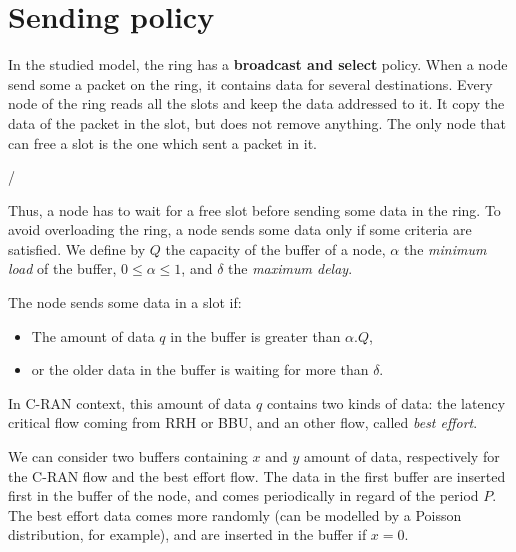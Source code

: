 \documentclass[a4paper,10pt]{article}
\begin{document}
\section*{Sending policy}
In the studied model, the ring has a {\bf broadcast and select} policy.
When a node send some a packet on the ring, it contains data for several destinations. Every node of the ring reads all the slots and keep the data addressed to it. It copy the data of the packet in the slot, but does not remove anything. The only node that can free a slot is the one which sent a packet in it.

/%

Thus, a node has to wait for a free slot before sending some data in the ring. To avoid overloading the ring, a node sends some data only if some criteria  are satisfied.
We define by $Q$ the capacity of the buffer of a node, $\alpha$ the {\em minimum load} of the buffer, $0 \leq  \alpha \leq 1$, and $\delta$ the {\em maximum delay}.

The node sends some data in a slot if:
\begin{itemize}
 \item The amount of data $q$ in the buffer is greater than $\alpha . Q$,
 \item or the older data in the buffer is waiting for more than $\delta$.
\end{itemize}

In C-RAN context, this amount of data $q$ contains two kinds of data: the latency critical flow coming from RRH or BBU, and an other flow, called {\em best effort}.

We can consider two buffers containing $x$ and $y$ amount of data, respectively for the C-RAN flow and the best effort flow.
The data in the first buffer are inserted first in the buffer of the node, and comes periodically in regard of the period $P$. 
The best effort data comes more randomly (can be modelled by a Poisson distribution, for example), and are inserted in the buffer if $x = 0$.
\end{document}
